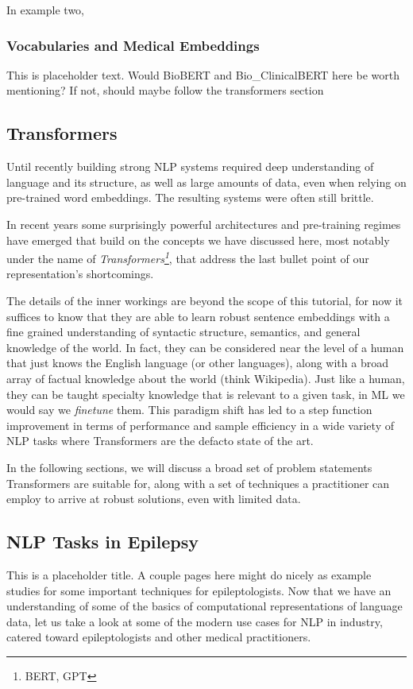 In example two,

\subsubsection{Vocabularies and Medical Embeddings}
This is placeholder text.
Would BioBERT and Bio_ClinicalBERT here be worth mentioning? If not, should maybe follow the transformers section

\subsection{Transformers}
Until recently building strong NLP systems required deep understanding of language and its structure, as well as large amounts of data, even when relying on pre-trained word embeddings.
The resulting systems were often still brittle.

In recent years some surprisingly powerful architectures and pre-training regimes have emerged that build on the concepts we have discussed here, most notably under the name of \textit{Transformers\footnote{BERT, GPT}}, that address the last bullet point of our representation's shortcomings.

The details of the inner workings are beyond the scope of this tutorial, for now it suffices to know that they are able to learn robust sentence embeddings with a fine grained understanding of syntactic structure, semantics, and general knowledge of the world.
In fact, they can be considered near the level of a human that just knows the English language (or other languages), along with a broad array of factual knowledge about the world (think Wikipedia).
Just like a human, they can be taught specialty knowledge that is relevant to a given task, in ML we would say we \textit{finetune} them.
This paradigm shift has led to a step function improvement in terms of performance and sample efficiency in a wide variety of NLP tasks where Transformers are the defacto state of the art.

In the following sections, we will discuss a broad set of problem statements Transformers are suitable for, along with a set of techniques a practitioner can employ to arrive at robust solutions, even with limited data.


\subsection{NLP Tasks in Epilepsy}
This is a placeholder title. A couple pages here might do nicely as example studies for some important techniques for epileptologists.
Now that we have an understanding of some of the basics of computational representations of language data, let us take a look at some of the modern use cases for NLP in industry,
catered toward epileptologists and other medical practitioners.

